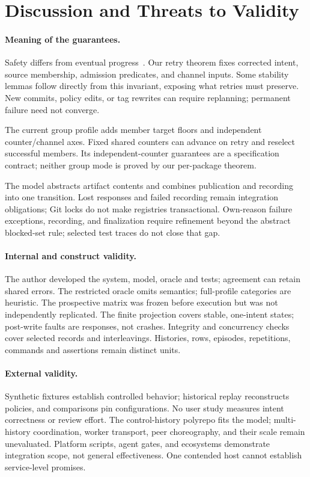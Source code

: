 \section{Discussion and Threats to Validity}
\label{sec:threats}
\paragraph{Meaning of the guarantees.}
Safety differs from eventual progress~\cite{safety}. Our retry theorem fixes
corrected intent, source membership, admission predicates, and channel inputs.
Some stability lemmas follow directly from this invariant, exposing what retries
must preserve. New commits, policy edits, or tag rewrites can require replanning;
permanent failure need not converge.

The current group profile adds member target floors and independent
counter/channel axes. Fixed shared counters can advance on retry and reselect
successful members. Its independent-counter guarantees are a specification
contract; neither group mode is proved by our per-package theorem.

The model abstracts artifact contents and combines publication and recording
into one transition. Lost responses and failed recording remain integration
obligations; Git locks do not make registries transactional. Own-reason failure
exceptions, recording, and finalization require refinement beyond the abstract
blocked-set rule; selected test traces do not close that gap.

\paragraph{Internal and construct validity.}
The author developed the system, model, oracle and tests; agreement can retain
shared errors. The restricted oracle omits semantics; full-profile categories
are heuristic. The prospective matrix was frozen before execution but was not
independently replicated. The finite projection covers stable, one-intent states;
post-write faults are responses, not crashes. Integrity and concurrency checks
cover selected records and interleavings. Histories, rows, episodes, repetitions,
commands and assertions remain distinct units.

\paragraph{External validity.}
Synthetic fixtures establish controlled behavior; historical replay reconstructs
policies, and comparisons pin configurations. No user study measures intent
correctness or review effort. The control-history polyrepo fits the model;
multi-history coordination, worker transport, peer choreography, and their scale remain
unevaluated. Platform scripts, agent gates, and ecosystems demonstrate
integration scope, not general effectiveness. One contended host cannot
establish service-level promises.

